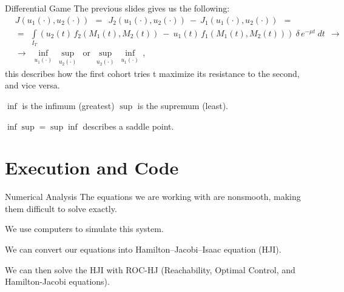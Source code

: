 \documentclass{beamer}
\begin{document}
\begin{frame}{Differential Game}
    The previous slides gives us the following:
    $$
    \begin{aligned}
    & J(u_1(\cdot), u_2(\cdot)) \:\: = \:\: J_2(u_1(\cdot), u_2(\cdot)) \: - \: J_1(u_1(\cdot), u_2(\cdot)) \:\: = \\
    & = \:\: \int\limits_{I_T} (u_2(t) \, f_2(M_1(t), M_2(t)) \: - \: u_1(t) \, f_1(M_1(t), M_2(t))) \: \delta \, e^{-\mu t} \: dt \:\:
    \longrightarrow \\
    & \longrightarrow \:\: \inf_{u_1(\cdot)} \: \sup_{u_2(\cdot)} \:\: \mbox{or} \:\:
    \sup_{u_2(\cdot)} \: \inf_{u_1(\cdot)} \, ,
    \end{aligned}
    $$ 
    this describes how the first cohort tries t maximize its resistance to the second, and vice versa.\newline
    
    $\inf$ is the infimum (greatest) $\sup$ is the supremum (least).\newline
    
    $\inf\sup=\sup\inf$ describes a saddle point.
    
\end{frame}

\section{Execution and Code}
\begin{frame}{Numerical Analysis}
    The equations we are working with are nonsmooth, making them difficult to solve exactly. \newline

    We use computers to simulate this system. \newline
    
    We can convert our equations into Hamilton--Jacobi--Isaac equation (HJI). \newline
    
    We can then solve the HJI with ROC-HJ (Reachability, Optimal Control, and Hamilton-Jacobi equations).
\end{frame}
\end{document}

